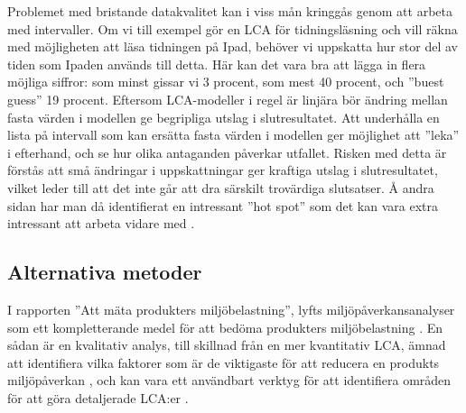 \documentclass{article}
\begin{document}
Problemet med bristande datakvalitet kan i viss mån kringgås genom att arbeta med intervaller. Om vi till exempel gör en LCA för tidningsläsning och vill räkna med möjligheten att läsa tidningen på Ipad, behöver vi uppskatta hur stor del av tiden som Ipaden används till detta. Här kan det vara bra att lägga in flera möjliga siffror: som minst gissar vi 3 procent, som mest 40 procent, och ''buest guess'' 19 procent. Eftersom LCA-modeller i regel är linjära bör ändring mellan fasta värden i modellen ge begripliga utslag i slutresultatet. Att underhålla en lista på intervall som kan ersätta fasta värden i modellen ger möjlighet att ''leka'' i efterhand, och se hur olika antaganden påverkar utfallet. Risken med detta är förstås att små ändringar i uppskattningar ger kraftiga utslag i slutresultatet, vilket leder till att det inte går att dra särskilt trovärdiga slutsatser. Å andra sidan har man då identifierat en intressant ''hot spot'' som det kan vara extra intressant att arbeta vidare med .

\subsection{Alternativa metoder}

I rapporten ''Att mäta produkters miljöbelastning'', lyfts miljöpåverkansanalyser som ett kompletterande medel för att bedöma produkters miljöbelastning . En sådan är en kvalitativ analys, till skillnad från en mer kvantitativ LCA, ämnad att identifiera vilka faktorer som är de viktigaste för att reducera en produkts miljöpåverkan , och kan vara ett användbart verktyg för att identifiera områden för att göra detaljerade LCA:er .


\end{document}
